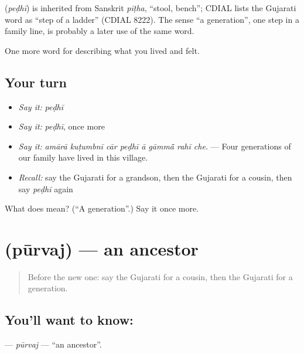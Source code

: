 \begin{cousinweb}
\textbf{} (\emph{peḍhī}) is inherited from Sanskrit \emph{pīṭha}, \textquotedblleft{}stool, bench\textquotedblright{}; CDIAL lists the Gujarati word as \textquotedblleft{}step of a ladder\textquotedblright{} (CDIAL 8222). The sense \textquotedblleft{}a generation\textquotedblright{}, one step in a family line, is probably a later use of the same word.
\end{cousinweb}

\begin{grammarlens}[title={What you've built}]
One more word for describing what you lived and felt.
\end{grammarlens}

\subsection*{Your turn}
\begin{itemize}
\raggedright
  \item \emph{Say it:} \emph{peḍhī}
  \item \emph{Say it:} \emph{peḍhī}, once more
  \item \emph{Say it:} \emph{amārā kuṭumbnī cār peḍhī ā gāmmā̃ rahī che.} — Four generations of our family have lived in this village.
  \item \emph{Recall:} say the Gujarati for a grandson, then the Gujarati for a cousin, then say \emph{peḍhī} again
\end{itemize}

\begin{tcolorbox}[breakable,colback=teal!4,colframe=teal!35!black,title={Before you move on}]
What does  mean? (\textquotedblleft{}A generation\textquotedblright{}.) Say it once more.
\end{tcolorbox}
\section[\texorpdfstring{\gu{પૂર્વજ} (pūrvaj)}{પૂર્વજ (pūrvaj)}]{ (pūrvaj) — an ancestor}

\label{lesson:GU-C493-purvaj}



\begin{quote}
Before the new one: say the Gujarati for a cousin, then the Gujarati for a generation.
\end{quote}

\subsection*{You'll want to know: }
\textbf{} — \emph{pūrvaj} — \textquotedblleft{}an ancestor\textquotedblright{}.

